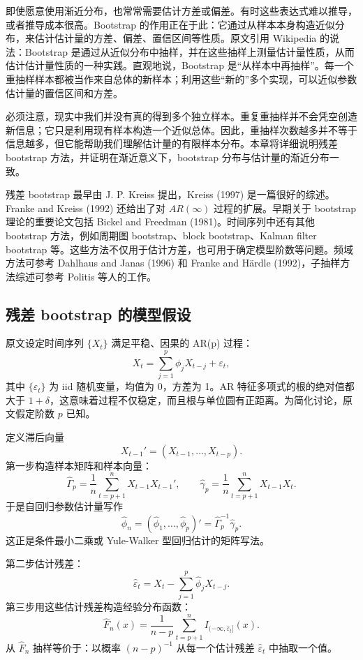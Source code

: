 \documentclass[11pt,a4paper,openany]{ctexbook}
\begin{document}
即使愿意使用渐近分布，也常常需要估计方差或偏差。有时这些表达式难以推导，或者推导成本很高。Bootstrap 的作用正在于此：它通过从样本本身构造近似分布，来估计估计量的方差、偏差、置信区间等性质。原文引用 Wikipedia 的说法：Bootstrap 是通过从近似分布中抽样，并在这些抽样上测量估计量性质，从而估计估计量性质的一种实践。直观地说，Bootstrap 是“从样本中再抽样”。每一个重抽样样本都被当作来自总体的新样本；利用这些“新的”多个实现，可以近似参数估计量的置信区间和方差。

必须注意，现实中我们并没有真的得到多个独立样本。重复重抽样并不会凭空创造新信息；它只是利用现有样本构造一个近似总体。因此，重抽样次数越多并不等于信息越多，但它能帮助我们理解估计量的有限样本分布。本章将详细说明残差 bootstrap 方法，并证明在渐近意义下，bootstrap 分布与估计量的渐近分布一致。

残差 bootstrap 最早由 J. P. Kreiss 提出，Kreiss (1997) 是一篇很好的综述。Franke and Kreiss (1992) 还给出了对 \(AR(\infty)\) 过程的扩展。早期关于 bootstrap 理论的重要论文包括 Bickel and Freedman (1981)。时间序列中还有其他 bootstrap 方法，例如周期图 bootstrap、block bootstrap、Kalman filter bootstrap 等。这些方法不仅用于估计方差，也可用于确定模型阶数等问题。频域方法可参考 Dahlhaus and Janas (1996) 和 Franke and Härdle (1992)，子抽样方法综述可参考 Politis 等人的工作。

\subsection{残差 bootstrap 的模型假设}

原文设定时间序列 \(\{X_t\}\) 满足平稳、因果的 AR(p) 过程：
\[
  X_t=\sum_{j=1}^p\phi_jX_{t-j}+\varepsilon_t,
\]
其中 \(\{\varepsilon_t\}\) 为 iid 随机变量，均值为 0，方差为 1。AR 特征多项式的根的绝对值都大于 \(1+\delta\)，这意味着过程不仅稳定，而且根与单位圆有正距离。为简化讨论，原文假定阶数 \(p\) 已知。

定义滞后向量
\[
  X_{t-1}'=(X_{t-1},\ldots,X_{t-p}).
\]
第一步构造样本矩阵和样本向量：
\[
  \hat\Gamma_p=\frac1n\sum_{t=p+1}^nX_{t-1}X_{t-1}',
  \qquad
  \hat\gamma_p=\frac1n\sum_{t=p+1}^nX_{t-1}X_t.
  \tag{15.1}
\]
于是自回归参数估计量写作
\[
  \hat\phi_n=(\hat\phi_1,\ldots,\hat\phi_p)'
  =\hat\Gamma_p^{-1}\hat\gamma_p.
\]
这正是条件最小二乘或 Yule-Walker 型回归估计的矩阵写法。

第二步估计残差：
\[
  \hat\varepsilon_t=X_t-\sum_{j=1}^p\hat\phi_jX_{t-j}.
\]
第三步用这些估计残差构造经验分布函数：
\[
  \hat F_n(x)
  =\frac1{n-p}\sum_{t=p+1}^n I_{(-\infty,\hat\varepsilon_t]}(x).
\]
从 \(\hat F_n\) 抽样等价于：以概率 \((n-p)^{-1}\) 从每一个估计残差 \(\hat\varepsilon_t\) 中抽取一个值。
\end{document}
